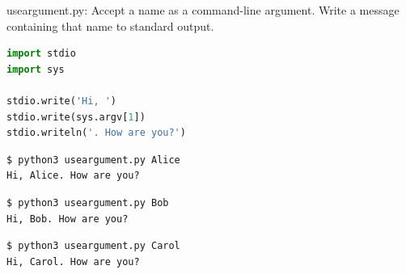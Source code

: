 \documentclass[8pt,a4paper,compress]{beamer}
\begin{document}
\begin{frame}[fragile]
\pause

\begin{framed}
\tiny useargument.py: Accept a name as a command-line argument. Write a message containing that name to standard output.
\end{framed}

\begin{lstlisting}[language=Python]
import stdio
import sys

stdio.write('Hi, ')
stdio.write(sys.argv[1])
stdio.writeln('. How are you?')
\end{lstlisting}

\pause
\begin{lstlisting}[language={}]
$ python3 useargument.py Alice
Hi, Alice. How are you?
\end{lstlisting}

\pause
\begin{lstlisting}[language={}]
$ python3 useargument.py Bob
Hi, Bob. How are you?
\end{lstlisting}

\pause
\begin{lstlisting}[language={}]
$ python3 useargument.py Carol
Hi, Carol. How are you?
\end{lstlisting}
\end{frame}
\end{document}

